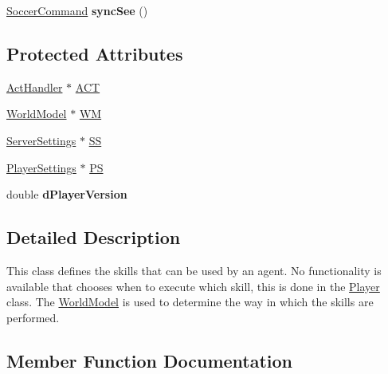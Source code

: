 \begin{DoxyCompactItemize}
\item 
\hyperlink{classSoccerCommand}{Soccer\+Command} {\bfseries sync\+See} ()\hypertarget{classBasicPlayer_aed979d279cb483bf8d5331d8cba0cd09}{}\label{classBasicPlayer_aed979d279cb483bf8d5331d8cba0cd09}

\end{DoxyCompactItemize}
\subsection*{Protected Attributes}
\begin{DoxyCompactItemize}
\item 
\hyperlink{classActHandler}{Act\+Handler} $\ast$ \hyperlink{classBasicPlayer_adb559ebfe52c2ca1b01cc21655bbed10}{A\+CT}
\item 
\hyperlink{classWorldModel}{World\+Model} $\ast$ \hyperlink{classBasicPlayer_a0a0a8b87ce4d8b6ad94a0fe594274715}{WM}
\item 
\hyperlink{classServerSettings}{Server\+Settings} $\ast$ \hyperlink{classBasicPlayer_a16daddc5f23e5862d115d1913a93fc1d}{SS}
\item 
\hyperlink{classPlayerSettings}{Player\+Settings} $\ast$ \hyperlink{classBasicPlayer_aef9a4fafd096a406d0ef5f85d11907b8}{PS}
\item 
double {\bfseries d\+Player\+Version}\hypertarget{classBasicPlayer_a9bd93798246ad9f9c0d7d544d7439488}{}\label{classBasicPlayer_a9bd93798246ad9f9c0d7d544d7439488}

\end{DoxyCompactItemize}


\subsection{Detailed Description}
This class defines the skills that can be used by an agent. No functionality is available that chooses when to execute which skill, this is done in the \hyperlink{classPlayer}{Player} class. The \hyperlink{classWorldModel}{World\+Model} is used to determine the way in which the skills are performed. 

\subsection{Member Function Documentation}
